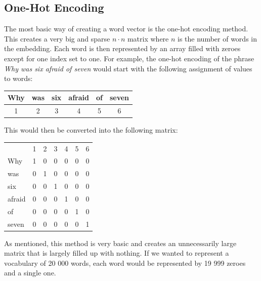 \documentclass[nofilelist]{cslthse-msc}
\begin{document}

\subsection{One-Hot Encoding}
The most basic way of creating a word vector is the one-hot encoding method. This creates a very big and sparse $n \cdot n$ matrix where $n$ is the number of words in the embedding. Each word is then represented by an array filled with zeroes except for one index set to one. For example, the one-hot encoding of the phrase \textit{Why was six afraid of seven} would start with the following assignment of values to words:

\begin{center}
    \begin{tabular}{c|c|c|c|c|c}
    
         Why & was & six & afraid & of & seven \\
         \hline
         1 & 2 & 3 & 4 & 5 & 6 \\
    \end{tabular}
\end{center}

This would then be converted into the following matrix:

\begin{center}
    \begin{tabular}{lllllll}
                            & 1 & 2 & 3 & 4 & 5 & 6 \\ \cline{2-7} 
\multicolumn{1}{l|}{Why}    & 1 & 0 & 0 & 0 & 0 & 0 \\
\multicolumn{1}{l|}{was}    & 0 & 1 & 0 & 0 & 0 & 0 \\
\multicolumn{1}{l|}{six}    & 0 & 0 & 1 & 0 & 0 & 0 \\
\multicolumn{1}{l|}{afraid} & 0 & 0 & 0 & 1 & 0 & 0 \\
\multicolumn{1}{l|}{of}     & 0 & 0 & 0 & 0 & 1 & 0 \\
\multicolumn{1}{l|}{seven}  & 0 & 0 & 0 & 0 & 0 & 1
    \end{tabular}
\end{center}

As mentioned, this method is very basic and creates an unnecessarily large matrix that is largely filled up with nothing. If we wanted to represent a vocabulary of 20 000 words, each word would be represented by 19 999 zeroes and a single one. 
\end{document}
